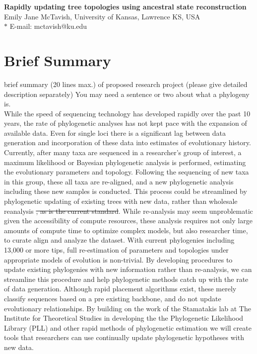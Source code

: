 \documentclass[10pt]{article}
\date{}
\newcommand{\mth}[1]{{\color{red} #1}\xspace}
\newcommand{\mthdel}[1]{{\color{red} \sout{#1}\xspace}}
\begin{document}
\begin{flushleft}
{\Large
\textbf{Rapidly updating tree topologies using ancestral state reconstruction}
}
\\
Emily Jane McTavish, University of Kansas, Lawrence KS, USA
\\

$\ast$ E-mail: mctavish@ku.edu
\end{flushleft}

\section*{Brief Summary}

brief summary (20 lines max.) of proposed research project (please give detailed description separately)
\mth{You may need a sentence or two about what a phylogeny is.\\}
While the speed of sequencing technology has developed rapidly over the past 10 years, the rate of phylogenetic analyses has not kept pace with the expansion of available data. 
Even for single loci there is a significant lag between data generation and incorporation of these data into estimates of evolutionary history. 
Currently, after many taxa are sequenced in a researcher's group of interest, a  maximum likelihood or Bayesian phylogenetic analysis is performed, estimating the evolutionary parameters and topology. 
Following the sequencing of new taxa in this group, these all taxa are re-aligned, and a new phylogenetic analysis including these new samples is conducted. 
This process could be streamlined by phylogenetic updating of existing trees with new data, rather than wholesale reanalysis\mthdel{, as is the current standard}. 
While re-analysis may seem unproblematic given the accessibility of compute resources, these analysis requires not only large amounts of compute time to optimize complex models, but also researcher time, to curate align and analyze the dataset. 
With current phylogenies including 13,000 \cite{smith_rates_2008} or more tips, full re-estimation of parameters and topologies under appropriate models of evolution is non-trivial. 
 By developing procedures to update existing phylogenies with new information rather than re-analysis, we can streamline this procedure and help phylogenetic methods catch up with the rate of data generation. 
Although rapid placement algorithms exist, these merely classify sequences based on a pre existing backbone, and do not update evolutionary relationships. 
By building on the work of the Stamatakis lab at The Institute for Theoretical Studies in developing the the Phylogenetic Likelihood Library (PLL) and other rapid methods of phylogenetic estimation we will create tools that researchers can use continually update phylogenetic hypotheses with new data.
\end{document}

